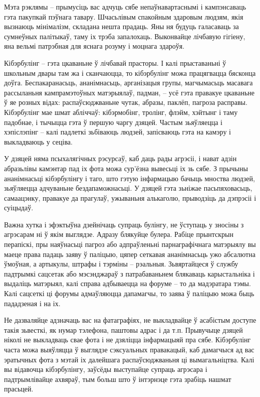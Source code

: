 Мэта рэклямы – прымусіць вас адчуць сябе непаўнавартаснымі і кампэнсаваць гэта пакупкай пэўнага тавару. Шчасьлівым спакойным здаровым людзям, якія вызнаюць мінімалізм, складана нешта прадаць. Яны ня будуць галасаваць за сумнеўных палітыкаў, таму іх трэба запалохаць. Выконвайце лічбавую гігіену, яна вельмі патрэбная для яснага розуму і моцнага здароўя.

Кібэрбулінг – гэта цкаваньне ў лічбавай прасторы. І калі прыставаньні ў школьным двары там жа і сканчаюцца, то кібэрбулінг можа працягвацца бясконца доўга. Беспакаранасьць, ананімнасьць, арганізацыя групы, магчымасьць масавага рассыланьня кампрамэтоўных матэрыялаў, падман, – усё гэта правакуе цкаваньне ў яе розных відах: распаўсюджваньне чутак, абразы, паклёп, пагроза расправы. Кібэрбулінг мае шмат абліччаў: кібэрмобінг, тролінг, флэйм, хэйтынг і таму падобнае, і тычыцца гэта ў першую чаргу дзяцей. Частым зьяўляецца і хэпіслэпінг – калі падлеткі зьбіваюць людзей, запісваюць гэта на камэру і выкладваюць у сеціва.

У дзяцей няма псыхалягічных рэсурсаў, каб даць рады агрэсіі, і нават адзін абразьлівы камэнтар пад іх фота можа сур'ёзна вывесьці іх зь сябе. З прычыны ананімнасьці кібэрбулінгу і таго, што гэтую інфармацыю бачыць мноства людзей, зьяўляецца адчуваньне бездапаможнасьці. У дзяцей гэта зьніжае пасьпяховасьць, самаацэнку, правакуе да прагулаў, ужываньня алькаголю, прыводзіць да дэпрэсіі і суіцыдаў.

Важна хутка і эфэктыўна дзейнічаць супраць булінгу, не ўступаць у зносіны з агрэсарам ні ў якім выглядзе. Адразу блякуйце булера. Рабіце прынтскрын перапіскі, пры наяўнасьці пагроз або адпраўленьні парнаграфічнага матэрыялу вы маеце права падаць заяву ў паліцыю, цяпер сеткавая ананімнасьць ужо абсалютна ўмоўная, а артыкулы, штрафы і тэрміны – рэальныя. Зьвяртайцеся ў службу падтрымкі сацсетак або мэсэнджараў з патрабаваньнем блякаваць карыстальніка і выдаліць матэрыял, калі справа адбываецца на форуме – то да мадэратара тэмы. Калі сацсеткі ці форумы адмаўляюцца дапамагчы, то заява ў паліцыю можа быць пададзеная і на іх.

Не дазваляйце адзначаць вас на фатаграфіях, не выкладвайце ў асабістым доступе такія зьвесткі, як нумар тэлефона, паштовы адрас і да т.п. Прывучыце дзяцей ніколі не выкладваць свае фота і не дзяліцца інфармацыяй пра сябе. Кібэрбулінг часта можа выяўляцца ў выглядзе сэксуальных правакацый, каб дамагчыся ад вас эратычных фота з мэтай іх далейшага распаўсюджваньня ці вымагальніцтва. Калі вы відавочца кібэрбулінгу, заўсёды выступайце супраць агрэсара і падтрымлівайце ахвяраў, тым больш што ў інтэрнэце гэта зрабіць нашмат прасьцей.

